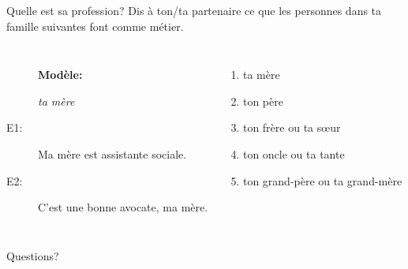 \documentclass{beamer}
\begin{document}
  \begin{frame}{Quelle est sa profession?}
    Dis à ton/ta partenaire ce que les personnes dans ta famille suivantes font comme métier. \\
    \begin{columns}
        \begin{description}
          \item[] \textbf{Modèle:}
          \item[] \emph{ta mère}
          \item[E1:] Ma mère est assistante sociale.
          \item[E2:] C'est une bonne avocate, ma mère.
        \end{description}
        \begin{enumerate}
          \item ta mère
          \item ton père
          \item ton frère ou ta sœur
          \item ton oncle ou ta tante
          \item ton grand-père ou ta grand-mère
        \end{enumerate}
    \end{columns}
  \end{frame}

  \begin{frame}{}
    \begin{center}
      \Large Questions?
    \end{center}
  \end{frame}
\end{document}
